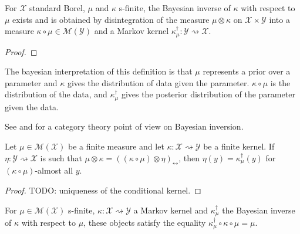 \begin{lemma}
  \label{lem:exists_bayesInv}
  \leanok
  For $\mathcal X$ standard Borel, $\mu$ and $\kappa$ s-finite, the Bayesian inverse of $\kappa$ with respect to $\mu$ exists and is obtained by disintegration of the measure $\mu \otimes \kappa$ on $\mathcal X \times \mathcal Y$ into a measure $\kappa \circ \mu \in \mathcal M(\mathcal Y)$ and a Markov kernel $\kappa_\mu^\dagger : \mathcal Y \rightsquigarrow \mathcal X$.
\end{lemma}

\begin{proof}\leanok
{}

\end{proof}


The bayesian interpretation of this definition is that $\mu$ represents a prior over a parameter and $\kappa$ gives the distribution of data given the parameter. $\kappa \circ \mu$ is the distribution of the data, and $\kappa_\mu^\dagger$ gives the posterior distribution of the parameter given the data.

See \cite{clerc2017pointless} and \cite{dahlqvist2018borel} for a category theory point of view on Bayesian inversion.

\begin{lemma}
  \label{lem:eq_bayesInv_of_compProd_eq}
  \leanok
  Let $\mu \in \mathcal M(\mathcal X)$ be a finite measure and let $\kappa : \mathcal X \rightsquigarrow \mathcal Y$ be a finite kernel.
  If $\eta : \mathcal Y \rightsquigarrow \mathcal X$ is such that $\mu \otimes \kappa = ((\kappa \circ \mu) \otimes \eta)_\leftrightarrow$, then $\eta(y) = \kappa_\mu^\dagger(y)$ for $(\kappa \circ \mu)$-almost all $y$.
\end{lemma}

\begin{proof}\leanok
\uses{}
TODO: uniqueness of the conditional kernel.
\end{proof}

\begin{lemma}
  \label{lem:bayesInv_comp_self}
  \leanok
  For $\mu \in \mathcal M(\mathcal X)$ s-finite, $\kappa : \mathcal X \rightsquigarrow \mathcal Y$ a Markov kernel and $\kappa_\mu^\dagger$ the Bayesian inverse of $\kappa$ with respect to $\mu$, these objects satisfy the equality $\kappa_\mu^\dagger \circ \kappa \circ \mu = \mu$.
\end{lemma}

